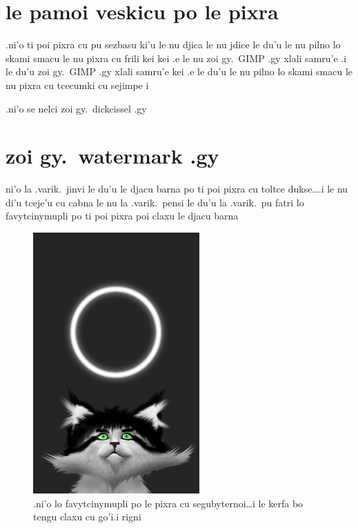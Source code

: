 \documentclass{report}
\begin{document}
\section{le pamoi veskicu po le pixra}
.ni'o ti poi pixra cu pu sezbasu ki'u le nu djica le nu jdice le du'u le nu pilno lo skami smacu le nu pixra cu frili kei kei .e le nu zoi gy.\ GIMP .gy xlali samru'e \@ .i le du'u zoi gy.\ GIMP .gy xlali samru'e kei .e le du'u le nu pilno lo skami smacu le nu pixra cu tcecumki cu sejimpe                                                     i

.ni'o se nelci zoi gy.\ dickcissel .gy
\section{zoi gy.\ watermark .gy}
ni'o la .varik.\ jinvi le du'u le djacu barna po ti poi pixra cu toltce dukse\ldots\@ .i le nu di'u tceje'u cu cabna le nu la .varik.\ pensi le du'u la .varik.\ pu fatri lo favytcinymupli po ti poi pixra poi claxu le djacu barna
\begin{figure}[ht]
	\centering
	\includegraphics[height=10cm]{20200414042645-03/20200414042645-03-uw.png}
	\caption[center]{.ni'o lo favytcinymupli po le pixra cu segubyternoi\ldots i le kerfa bo tengu claxu cu go'i\@  .i rigni}
\end{figure}
\end{document}
